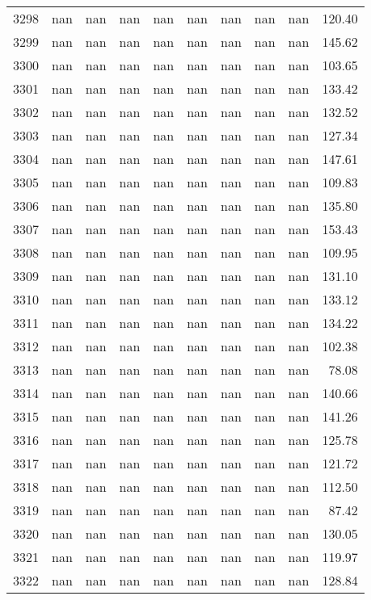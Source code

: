\begin{tabular}{lrrrrrrrrr}
3298 & nan & nan & nan & nan & nan & nan & nan & nan & 120.40 \\
3299 & nan & nan & nan & nan & nan & nan & nan & nan & 145.62 \\
3300 & nan & nan & nan & nan & nan & nan & nan & nan & 103.65 \\
3301 & nan & nan & nan & nan & nan & nan & nan & nan & 133.42 \\
3302 & nan & nan & nan & nan & nan & nan & nan & nan & 132.52 \\
3303 & nan & nan & nan & nan & nan & nan & nan & nan & 127.34 \\
3304 & nan & nan & nan & nan & nan & nan & nan & nan & 147.61 \\
3305 & nan & nan & nan & nan & nan & nan & nan & nan & 109.83 \\
3306 & nan & nan & nan & nan & nan & nan & nan & nan & 135.80 \\
3307 & nan & nan & nan & nan & nan & nan & nan & nan & 153.43 \\
3308 & nan & nan & nan & nan & nan & nan & nan & nan & 109.95 \\
3309 & nan & nan & nan & nan & nan & nan & nan & nan & 131.10 \\
3310 & nan & nan & nan & nan & nan & nan & nan & nan & 133.12 \\
3311 & nan & nan & nan & nan & nan & nan & nan & nan & 134.22 \\
3312 & nan & nan & nan & nan & nan & nan & nan & nan & 102.38 \\
3313 & nan & nan & nan & nan & nan & nan & nan & nan & 78.08 \\
3314 & nan & nan & nan & nan & nan & nan & nan & nan & 140.66 \\
3315 & nan & nan & nan & nan & nan & nan & nan & nan & 141.26 \\
3316 & nan & nan & nan & nan & nan & nan & nan & nan & 125.78 \\
3317 & nan & nan & nan & nan & nan & nan & nan & nan & 121.72 \\
3318 & nan & nan & nan & nan & nan & nan & nan & nan & 112.50 \\
3319 & nan & nan & nan & nan & nan & nan & nan & nan & 87.42 \\
3320 & nan & nan & nan & nan & nan & nan & nan & nan & 130.05 \\
3321 & nan & nan & nan & nan & nan & nan & nan & nan & 119.97 \\
3322 & nan & nan & nan & nan & nan & nan & nan & nan & 128.84 \\

\end{tabular}
